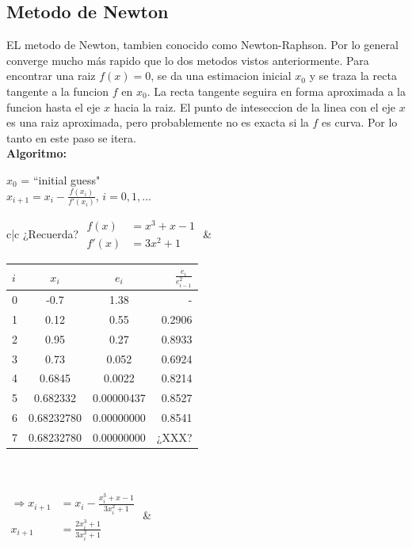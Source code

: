 \newpage
\raggedright
\subsection{Metodo de Newton}

EL metodo de Newton, tambien conocido como Newton-Raphson. Por lo general converge mucho más rapido que lo dos metodos vistos anteriormente. Para encontrar una raiz $f(x) = 0 $, se da una estimacion inicial $x_0$ y se traza la recta tangente a la funcion $f$ en $x_0$. La recta tangente seguira en forma aproximada a la funcion hasta el eje $x$ hacia la raiz. El punto de inteseccion de la linea con el eje $x$ es una raiz aproximada, pero probablemente no es exacta si la $f$ es curva. Por lo tanto en este paso se itera.\\
\vspace{0.5cm}
\hspace{2.8cm}\textbf{Algoritmo:}\\ 	
\begin{center}
\(x_0\) = ``initial guess" \\
\hspace{1cm} \( \displaystyle x_{i+1} = x_i - \frac{f(x_i)}{f'(x_i)}\), \(i = 0, 1, ...\)
\end{center}
\vspace{0.5cm}
\begin{tabular}{c|c}
¿Recuerda? \(\begin{aligned}f(x) &= x^3 + x - 1\\ f'(x) &= 3x^2 + 1 \end{aligned}\) & \hspace{2cm}\begin{tabular}{l | c | c | r}
\(i\) & \(x_i\) & \(e_i\) & \(\frac{e_i}{e_{i-1}^2}\) \\
\hline
0 & -0.7  & 1.38  & -  \\
\hline
1 & 0.12  & 0.55  & 0.2906  \\
\hline
2 & 0.95  & 0.27  & 0.8933  \\
\hline
3 & 0.73  & 0.052  & 0.6924  \\
\hline
4 & 0.6845  & 0.0022  & 0.8214  \\
\hline
5 & 0.682332  & 0.00000437  & 0.8527  \\
\hline
6 & 0.68232780  & 0.00000000  &  0.8541 \\
\hline
7 & 0.68232780  & 0.00000000  &  ¿XXX? \\
\end{tabular}\\ \\
$\begin{aligned}\Rightarrow x_{i+1} &= x_i - \frac{x_{i}^3 + x - 1}{3x_{i}^2 + 1}\\ x_{i+1} &= \frac{2x_{i}^3 + 1}{3x_{i}^2 + 1}\end{aligned} $ & \\
\end{tabular}
